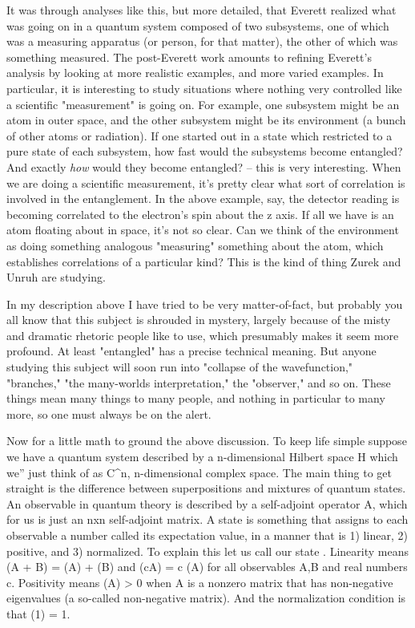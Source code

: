 It was through analyses like this, but more detailed, that
Everett realized what was going on in a quantum system composed
of two subsystems, one of which was a measuring apparatus (or
person, for that matter), the other of which was something
measured.   The post-Everett work amounts to refining Everett's
analysis by looking at more realistic examples, and more varied
examples.  In particular, it is interesting to study situations
where nothing very controlled like a scientific "measurement" is
going on.  For example, one subsystem might be an atom in outer
space, and the other subsystem might be its environment (a bunch
of other atoms or radiation).  If one started out in a state
which restricted to a pure state of each subsystem, how fast
would the subsystems become entangled?  And exactly \emph{how} would
they become entangled? -- this is very interesting.  When we are
doing a scientific measurement, it's pretty clear what sort of
correlation is involved in the entanglement.  In the above
example, say, the detector reading is becoming correlated to the
electron's spin about the z axis.  If all we have is an atom
floating about in space, it's not so clear. Can we think of the
environment as doing something analogous "measuring" something
about the atom, which establishes correlations of a particular
kind?  This is the kind of thing Zurek and Unruh are studying.

In my description above I have tried to be very matter-of-fact,
but probably you all know that this subject is shrouded in
mystery, largely because of the misty and dramatic rhetoric
people like to use, which presumably makes it seem more profound. 
At least "entangled" has a precise technical meaning.  But anyone
studying this subject will soon run into "collapse of the
wavefunction," "branches," "the many-worlds interpretation," the
"observer," and so on.  These things mean many things to many
people, and nothing in particular to many more, so one must
always be on the alert.  

Now for a little math to ground the above discussion. To keep
life simple suppose we have a quantum system described by a
n-dimensional Hilbert space H which we'' just think of as C^n,
n-dimensional complex space.  The main thing to get straight is
the difference between superpositions and mixtures of quantum
states.  An observable in quantum theory is described by a
self-adjoint operator A, which for us is just an nxn self-adjoint
matrix.  A state is something that assigns to each observable a
number called its expectation value, in a manner that is 1)
linear, 2) positive, and 3) normalized.  To explain this let us
call our state \Psi .  Linearity means \Psi (A + B) = \Psi (A) + \Psi (B)
and \Psi (cA) = c \Psi (A) for all observables A,B and real numbers
c.  Positivity means \Psi (A) > 0 when A is a nonzero matrix that
has non-negative eigenvalues (a so-called non-negative matrix).  
And the normalization condition is that \Psi (1) = 1.

